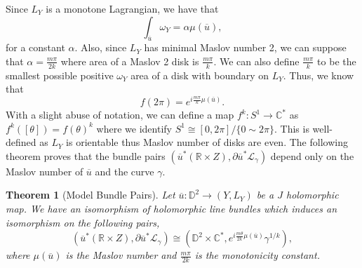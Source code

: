 \documentclass[11pt, oneside,dvipsnames]{amsart}
\renewcommand{\to}{\rightarrow}
\renewcommand{\to}{\rightarrow}
\newcommand{\<}{\langle}
\renewcommand{\>}{\rangle}
\newcommand{\bC}{\mathbb{C}}
\newcommand{\bD}{\mathbb{D}}
\newcommand{\bR}{\mathbb{R}}
\newcommand{\cL}{\mathcal{L}}
\renewcommand{\to}{\rightarrow}
\newtheorem{Theorem}{Theorem}[section]
\theoremstyle{definition}
\theoremstyle{definition}
\numberwithin{equation}{subsection}
\begin{document}
Since $L_Y$ is a monotone Lagrangian, we have that $$\int_{\overline{u}}\omega_Y = \alpha \mu(\overline{u}),$$ for a constant $\alpha.$ Also, since $L_Y$ has minimal Maslov number 2, we can suppose that $\alpha = \frac{m\pi}{2k}$ where area of a Maslov 2 disk is $\frac{m \pi}{k}.$ We can also define $\frac{m \pi}{k}$ to be the smallest possible positive $\omega_Y$ area of a disk with boundary on $L_Y$. Thus, we know that $$f(2\pi)=e^{i\frac{m\pi}{k} \mu(\overline{ u})}.$$ With a slight abuse of notation, we can  define a map $f^k : S^1 \to \bC^*$ as $f^k([\theta]) = f(\theta)^k$ where we identify $S^1 \cong [0,2\pi]/ \{  0 \sim 2\pi \}$. This is well-defined as $L_Y$ is orientable thus Maslov number of disks are even. The following theorem proves that the bundle pairs $(\overline{u}^* (\bR \times Z), \partial{\overline{u}}^* \cL_\gamma)$ depend only on the Maslov number of $\overline{u}$ and the curve $\gamma$.
\begin{Theorem}[Model Bundle Pairs]\label{modelthm}
    Let $\overline{u} : \bD^2 \to (Y,L_Y)$ be a $J$ holomorphic map. We have an isomorphism of holomorphic line  bundles which induces an isomorphism on the following pairs,
    $$(\overline{u}^* (\bR \times Z), \partial{\overline{u}}^* \cL_\gamma) \cong (\bD^2 \times \bC^*, e^{i\frac{m\theta}{2k}\mu(\overline{u})} \gamma^{1/k} ),$$ where $\mu(\overline {u})$ is the Maslov number and $\frac{m\pi}{2k}$ is the monotonicity constant.
\end{Theorem}
\end{document}
